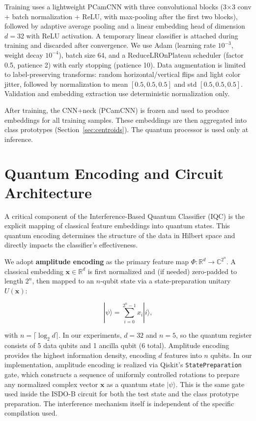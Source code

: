 \documentclass[conference]{IEEEtran}
\begin{document}
Training uses a lightweight PCamCNN with three convolutional blocks (3$\times$3 conv + batch normalization + ReLU, with max-pooling after the first two blocks), followed by adaptive average pooling and a linear embedding head of dimension $d=32$ with ReLU activation. A temporary linear classifier is attached during training and discarded after convergence. We use Adam (learning rate $10^{-3}$, weight decay $10^{-4}$), batch size 64, and a ReduceLROnPlateau scheduler (factor 0.5, patience 2) with early stopping (patience 10). Data augmentation is limited to label-preserving transforms: random horizontal/vertical flips and light color jitter, followed by normalization to mean $[0.5,0.5,0.5]$ and std $[0.5,0.5,0.5]$. Validation and embedding extraction use deterministic normalization only.

After training, the CNN+neck (PCamCNN) is frozen and used to produce embeddings for all training samples. These embeddings are then aggregated into class prototypes (Section~\ref{sec:centroids}). The quantum processor is used only at inference.


\section{Quantum Encoding and Circuit Architecture}

A critical component of the Interference-Based Quantum Classifier (IQC) is the explicit mapping of classical feature embeddings into quantum states. This quantum encoding determines the structure of the data in Hilbert space and directly impacts the classifier's effectiveness.

We adopt \textbf{amplitude encoding} as the primary feature map $\Phi: \mathbb{R}^d \rightarrow \mathbb{C}^{2^n}$. A classical embedding $\mathbf{x} \in \mathbb{R}^d$ is first normalized and (if needed) zero-padded to length $2^n$, then mapped to an $n$-qubit state via a state-preparation unitary $U(\mathbf{x})$:

\begin{equation}
|\psi\rangle = \sum_{i=0}^{2^n - 1} x_i |i\rangle,
\end{equation}

with $n = \lceil \log_2 d \rceil$. In our experiments, $d = 32$ and $n = 5$, so the quantum register consists of 5 data qubits and 1 ancilla qubit (6 total). Amplitude encoding provides the highest information density, encoding $d$ features into $n$ qubits. In our implementation, amplitude encoding is realized via Qiskit's \texttt{StatePreparation} gate, which constructs a sequence of uniformly controlled rotations to prepare any normalized complex vector $\mathbf{x}$ as a quantum state $|\psi\rangle$. This is the same gate used inside the ISDO-B circuit for both the test state and the class prototype preparation. The interference mechanism itself is independent of the specific compilation used.
\end{document}
